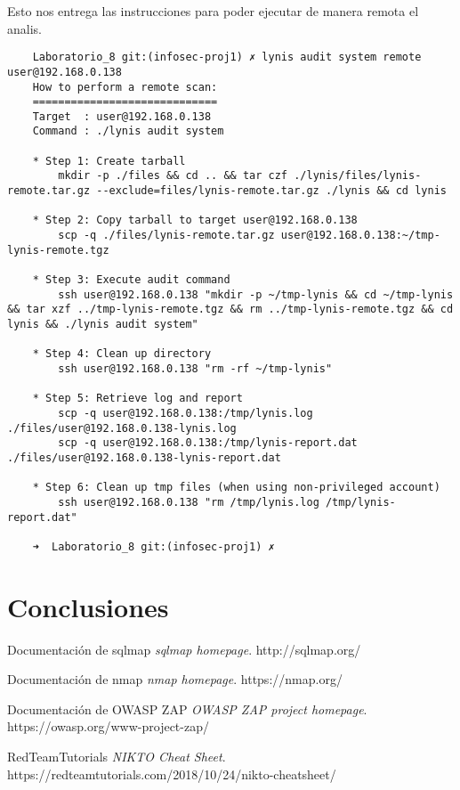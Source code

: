 \documentclass[11pt]{utalcaDoc}
\begin{document}
Esto nos entrega las instrucciones para poder ejecutar de manera remota el analis. 
\begin{verbatim}
	Laboratorio_8 git:(infosec-proj1) ✗ lynis audit system remote user@192.168.0.138
	How to perform a remote scan:
	=============================
	Target  : user@192.168.0.138
	Command : ./lynis audit system

	* Step 1: Create tarball
		mkdir -p ./files && cd .. && tar czf ./lynis/files/lynis-remote.tar.gz --exclude=files/lynis-remote.tar.gz ./lynis && cd lynis

	* Step 2: Copy tarball to target user@192.168.0.138
		scp -q ./files/lynis-remote.tar.gz user@192.168.0.138:~/tmp-lynis-remote.tgz

	* Step 3: Execute audit command
		ssh user@192.168.0.138 "mkdir -p ~/tmp-lynis && cd ~/tmp-lynis && tar xzf ../tmp-lynis-remote.tgz && rm ../tmp-lynis-remote.tgz && cd lynis && ./lynis audit system"

	* Step 4: Clean up directory
		ssh user@192.168.0.138 "rm -rf ~/tmp-lynis"

	* Step 5: Retrieve log and report
		scp -q user@192.168.0.138:/tmp/lynis.log ./files/user@192.168.0.138-lynis.log
		scp -q user@192.168.0.138:/tmp/lynis-report.dat ./files/user@192.168.0.138-lynis-report.dat

	* Step 6: Clean up tmp files (when using non-privileged account)
		ssh user@192.168.0.138 "rm /tmp/lynis.log /tmp/lynis-report.dat"

	➜  Laboratorio_8 git:(infosec-proj1) ✗ 
\end{verbatim}






\section{Conclusiones}



\begin{thebibliography}{9}

	Documentación de sqlmap
	\textit{sqlmap homepage}.
	http://sqlmap.org/

	Documentación de nmap
	\textit{nmap homepage}.
	https://nmap.org/

	Documentación de OWASP ZAP
	\textit{OWASP ZAP project homepage}.
	https://owasp.org/www-project-zap/


	RedTeamTutorials
	\textit{NIKTO Cheat Sheet}.
	https://redteamtutorials.com/2018/10/24/nikto-cheatsheet/
\end{thebibliography}
\end{document}
